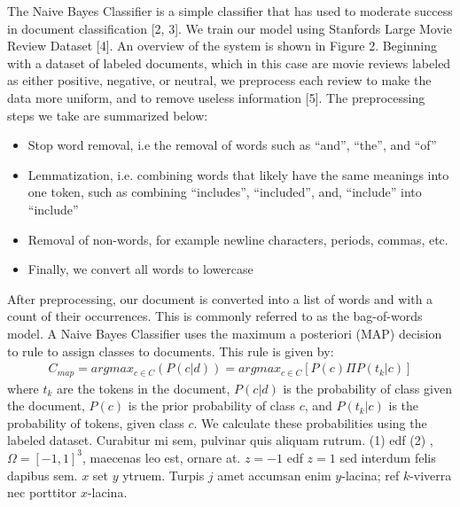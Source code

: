 \documentclass[a0,portrait]{a0poster}
\begin{document}
\begin{multicols}{2}
The Naive Bayes Classifier is a simple classifier that has used to moderate success in document classification [2, 3]. We train our model using Stanfords Large Movie Review Dataset [4]. An overview of the system is shown in Figure 2.
\newline
\newline
Beginning with a dataset of labeled documents, which in this case are movie reviews labeled as either positive, negative, or neutral, we preprocess each review to make the data more uniform, and to remove useless information [5]. The preprocessing steps we take are summarized below:
\newline
\begin{itemize}
\item Stop word removal, i.e the removal of words such as “and”,  “the”, and “of”
\item Lemmatization, i.e. combining words that likely have the same meanings into one token, such as combining “includes”, “included”, and, “include” into “include”
\item Removal of non-words, for example newline characters, periods, commas, etc.
\item Finally, we convert all words to lowercase
\end{itemize}
\leavevmode
\newline
After preprocessing, our document is converted into a list of words and with a count of their occurrences. This is commonly referred to as the bag-of-words model. 
\newline
\newline
A Naive Bayes Classifier uses the maximum a posteriori (MAP) decision to rule to assign classes to documents. This rule is given by:
\begin{eqnarray}
C_{map} = argmax_{c\in C} (P(c|d)) = argmax_{c\in C}[P(c)\Pi P(t_k |c)]
\label{eqn:Equation 1}
\end{eqnarray}
where \(t_k\) are the tokens in the document, \(P(c|d)\) is the probability of class given the document, \(P(c)\) is the prior probability of class \(c\), and \(P(t_k|c)\) is the probability of tokens, given class \(c\). We calculate these probabilities using the labeled dataset. 
\leavevmode
\newline
\newline
Curabitur mi sem, pulvinar quis aliquam rutrum. (1) edf (2)
, $\Omega=[-1,1]^3$, maecenas leo est, ornare at. $z=-1$ edf $z=1$ sed interdum felis dapibus sem. $x$ set $y$ ytruem. 
Turpis $j$ amet accumsan enim $y$-lacina; 
ref $k$-viverra nec porttitor $x$-lacina. 


\end{multicols}
\end{document}
